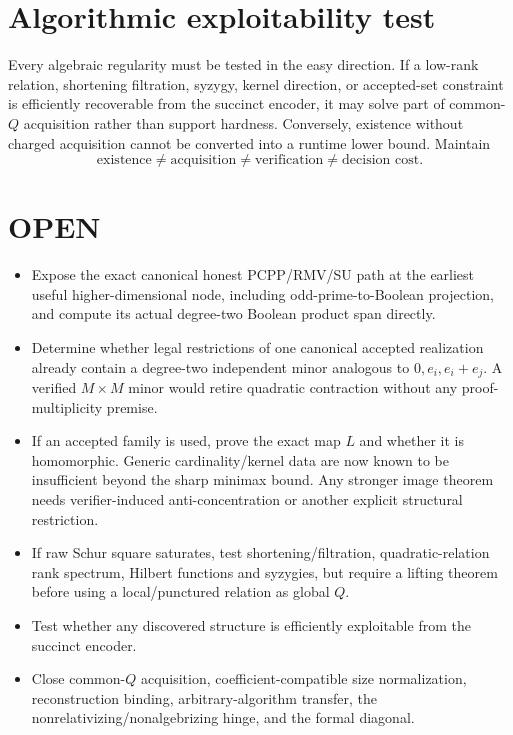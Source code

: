 \documentclass[11pt]{article}
\begin{document}
\section*{Algorithmic exploitability test}
Every algebraic regularity must be tested in the easy direction. If a low-rank relation, shortening filtration, syzygy, kernel direction, or accepted-set constraint is efficiently recoverable from the succinct encoder, it may solve part of common-$Q$ acquisition rather than support hardness. Conversely, existence without charged acquisition cannot be converted into a runtime lower bound. Maintain
\[
\text{existence}\ne\text{acquisition}\ne\text{verification}\ne\text{decision cost}.
\]

\section*{OPEN}
\begin{itemize}
\item Expose the exact canonical honest PCPP/RMV/SU path at the earliest useful higher-dimensional node, including odd-prime-to-Boolean projection, and compute its actual degree-two Boolean product span directly.
\item Determine whether legal restrictions of one canonical accepted realization already contain a degree-two independent minor analogous to $0,e_i,e_i+e_j$. A verified $M\times M$ minor would retire quadratic contraction without any proof-multiplicity premise.
\item If an accepted family is used, prove the exact map $L$ and whether it is homomorphic. Generic cardinality/kernel data are now known to be insufficient beyond the sharp minimax bound. Any stronger image theorem needs verifier-induced anti-concentration or another explicit structural restriction.
\item If raw Schur square saturates, test shortening/filtration, quadratic-relation rank spectrum, Hilbert functions and syzygies, but require a lifting theorem before using a local/punctured relation as global $Q$.
\item Test whether any discovered structure is efficiently exploitable from the succinct encoder.
\item Close common-$Q$ acquisition, coefficient-compatible size normalization, reconstruction binding, arbitrary-algorithm transfer, the nonrelativizing/nonalgebrizing hinge, and the formal diagonal.
\end{itemize}
\end{document}
